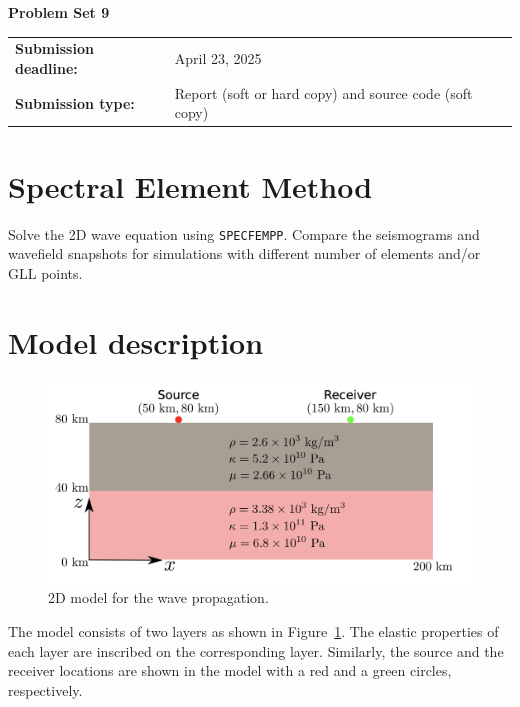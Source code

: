 \documentclass[11pt,titlepage,fleqn]{article}
\begin{document}
\pagestyle{fancy} \lhead{{\bf \Large}}
 \renewcommand{%
\headrulewidth}{0.5 pt}


\begin{center}
{\Large {\bf Problem Set 9}}
\end{center} 

\begin{tabular}{@{}p{1.8in}p{4in}}
\bf{Submission deadline:} & April 23, 2025 \\            
\bf{Submission type:} & Report (soft or hard copy) and source code (soft copy)  
\end{tabular}

\section*{Spectral Element Method}

Solve the 2D wave equation using \texttt{SPECFEMPP}. Compare the seismograms and wavefield snapshots for simulations with different number of elements and/or GLL points.

\section*{Model description}

\begin{figure}[htbp]
\centering
\includegraphics[width=\textwidth]{model.png}
\caption{2D model for the wave propagation.}
\label{fig:model}
\end{figure}

The model consists of two layers as shown in Figure~\ref{fig:model}. The elastic properties of each layer are inscribed on the corresponding layer. Similarly, the source and the receiver locations are shown in the model with a red and a green circles, respectively.
    
\end{document}
